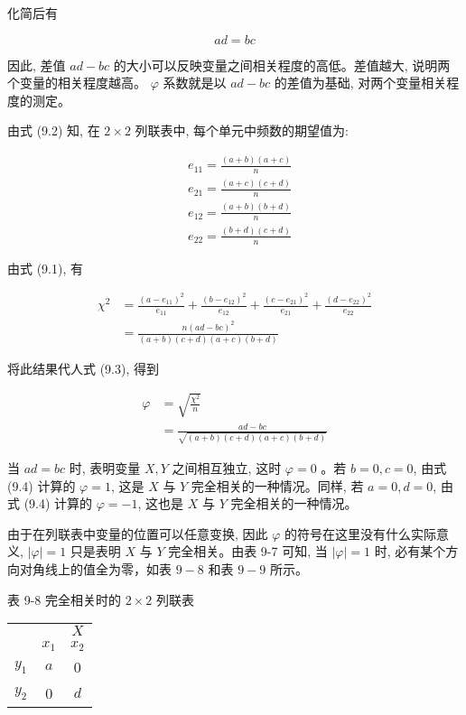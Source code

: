\documentclass[10pt]{article}
\begin{document}
\begin{CJK*}{UTF8}{bsmi}
化简后有

$$
a d=b c
$$

因此, 差值 $a d-b c$ 的大小可以反映变量之间相关程度的高低。差值越大, 说明两个变量的相关程度越高。 $\varphi$ 系数就是以 $a d-b c$ 的差值为基础, 对两个变量相关程度的测定。

由式 (9.2) 知, 在 $2 \times 2$ 列联表中, 每个单元中频数的期望值为:

$$
\begin{aligned}
& e_{11}=\frac{(a+b)(a+c)}{n} \\
& e_{21}=\frac{(a+c)(c+d)}{n} \\
& e_{12}=\frac{(a+b)(b+d)}{n} \\
& e_{22}=\frac{(b+d)(c+d)}{n}
\end{aligned}
$$

由式 (9.1), 有

$$
\begin{aligned}
\chi^{2} & =\frac{\left(a-e_{11}\right)^{2}}{e_{11}}+\frac{\left(b-e_{12}\right)^{2}}{e_{12}}+\frac{\left(c-e_{21}\right)^{2}}{e_{21}}+\frac{\left(d-e_{22}\right)^{2}}{e_{22}} \\
& =\frac{n(a d-b c)^{2}}{(a+b)(c+d)(a+c)(b+d)}
\end{aligned}
$$

将此结果代人式 (9.3), 得到


\begin{align*}
\varphi & =\sqrt{\frac{\chi^{2}}{n}} \\
& =\frac{a d-b c}{\sqrt{(a+b)(c+d)(a+c)(b+d)}} \tag{9.4}
\end{align*}


当 $a d=b c$ 时, 表明变量 $X, Y$ 之间相互独立, 这时 $\varphi=0$ 。若 $b=0, c=0$, 由式 (9.4) 计算的 $\varphi=1$, 这是 $X$ 与 $Y$ 完全相关的一种情况。同样, 若 $a=0, d=0$, 由\\
式 (9.4) 计算的 $\varphi=-1$, 这也是 $X$ 与 $Y$ 完全相关的一种情况。

由于在列联表中变量的位置可以任意变换, 因此 $\varphi$ 的符号在这里没有什么实际意义, $|\varphi|=1$ 只是表明 $X$ 与 $Y$ 完全相关。由表 9-7 可知, 当 $|\varphi|=1$ 时, 必有某个方向对角线上的值全为零，如表 $9-8$ 和表 $9-9$ 所示。

表 9-8 完全相关时的 $2 \times 2$ 列联表

\begin{center}
\begin{tabular}{ccc}
\hline
 &  & $X$ \\
\cline { 2 - 3 }
 & $x_{1}$ & $x_{2}$ \\
\hline
$y_{1}$ & $a$ & 0 \\
$y_{2}$ & 0 & $d$ \\
\hline
\end{tabular}
\end{center}


\end{CJK*}
\end{document}
